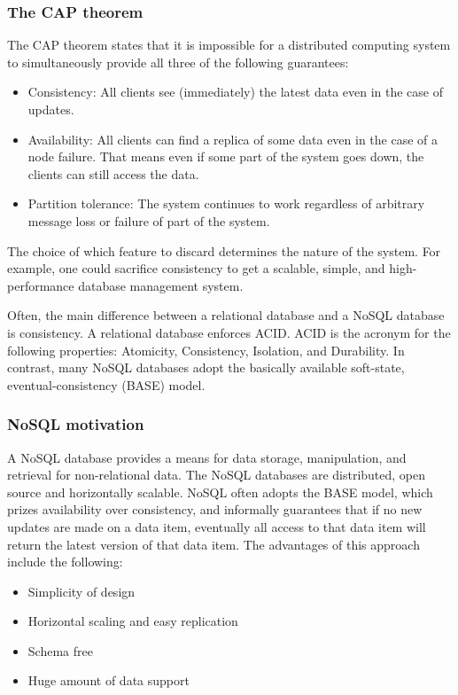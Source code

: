 \subsubsection*{The CAP theorem}
The CAP theorem states that it is impossible for a distributed computing system to simultaneously provide all three of the following guarantees:
\begin{itemize}
	\item Consistency: All clients see (immediately) the latest data even in the case of updates.
	\item Availability: All clients can find a replica of some data even in the case of a node failure. That means even if some part of the system goes down, the clients can still access the data.
	\item Partition tolerance: The system continues to work regardless of arbitrary message loss or failure of part of the system.
\end{itemize}

The choice of which feature to discard determines the nature of the system. For example, one could sacrifice consistency to get a scalable, simple, and high-performance database management system.
\newline

Often, the main difference between a relational database and a NoSQL database is consistency. A relational database enforces ACID. ACID is the acronym for the following properties: Atomicity, Consistency, Isolation, and Durability. In contrast, many NoSQL databases adopt the basically available soft-state, eventual-consistency (BASE) model.

\subsubsection*{NoSQL motivation}
A NoSQL database provides a means for data storage, manipulation, and retrieval for non-relational data. The NoSQL databases are distributed, open source and horizontally scalable. NoSQL often adopts the BASE model, which prizes availability over consistency, and informally guarantees that if no new updates are made on a data item, eventually all access to that data item will return the latest version of that data item. The advantages of this approach include the following:
\begin{itemize}
	\item Simplicity of design
	\item Horizontal scaling and easy replication
	\item Schema free
	\item Huge amount of data support
\end{itemize}

